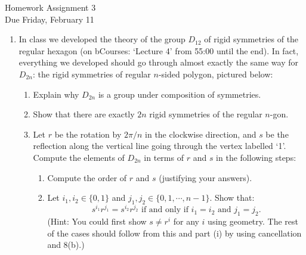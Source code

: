 \documentclass[11pt]{article}
\begin{document}
\begin{center}
\Large {Homework Assignment 3}\\
\small {Due Friday, February 11}
\end{center}
\begin{enumerate}
	\item{In class we developed the theory of the group $D_{12}$ of rigid symmetries of the regular hexagon (on bCourses: `Lecture 4' from 55:00 until the end).  In fact, everything we developed should go through almost exactly the same way for $D_{2n}$: the rigid symmetries of regular $n$-sided polygon, pictured below:
	\begin{center}
   \end{center}
   }
   \begin{enumerate}
     \item{
     Explain why $D_{2n}$ is a group under composition of symmetries.
     }
     \item{
     Show that there are exactly $2n$ rigid symmetries of the regular $n$-gon.
     }
     \item{
     Let $r$ be the rotation by $2\pi/n$ in the clockwise direction, and $s$ be the reflection along the vertical line going through the vertex labelled `1'.  Compute the elements of $D_{2n}$ in terms of $r$ and $s$ in the following steps:
     \begin{enumerate}
       \item{
       Compute the order of $r$ and $s$ (justifying your answers).
       }
       \item{
       Let $i_1,i_2\in\{0,1\}$ and $j_1,j_2\in\{0,1,\cdots,n-1\}$.  Show that:
       \[s^{i_1}r^{j_1}=s^{i_2}r^{j_2}\text{ if and only if }i_1=i_2\text{ and }j_1=j_2.\]
       }
       (Hint: You could first show $s\not=r^i$ for any $i$ using geometry.  The rest of the cases should follow from this and part (i) by using cancellation and 8(b).)

\end{enumerate}}
\end{enumerate}
\end{enumerate}
\end{document}
